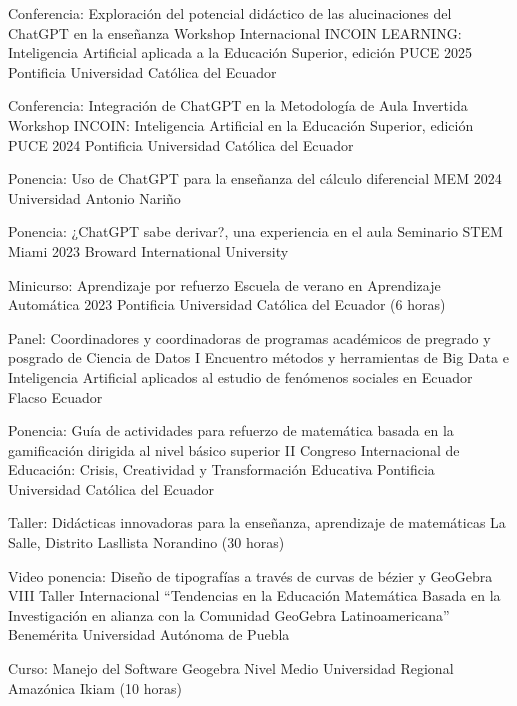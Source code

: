 \documentclass[
    a4paper,
    maincolor=cvblue!70!blue,
    sidecolor=gray!30,
    sectioncolor=cvblue!70!blue,
    sidebarwidth=7.5cm,
    topbottommargin=20pt,
    leftrightmargin=20pt,
]{fortysecondscv}
\begin{document}
    {Conferencia: Exploración del potencial didáctico de las alucinaciones del ChatGPT en la enseñanza}
    {Workshop Internacional INCOIN LEARNING: Inteligencia Artificial aplicada a la Educación Superior, edición PUCE 2025}
    {Pontificia Universidad Católica del Ecuador}
    
    {Conferencia: Integración de ChatGPT en la Metodología de Aula Invertida}
    {Workshop INCOIN: Inteligencia Artificial en la Educación Superior, edición PUCE 2024}
    {Pontificia Universidad Católica del Ecuador}
    
    {Ponencia: Uso de ChatGPT para la enseñanza del cálculo diferencial}
    {MEM 2024}
    {Universidad Antonio Nariño}
    
    {Ponencia: ¿ChatGPT sabe derivar?, una experiencia en el aula}
    {Seminario STEM Miami 2023}
    {Broward International University}
    
    
    {Minicurso: Aprendizaje por refuerzo}
    {Escuela de verano en Aprendizaje Automática 2023}
    {Pontificia Universidad Católica del Ecuador (6 horas)}
    
    
    {Panel: Coordinadores y coordinadoras de  programas académicos de pregrado y posgrado de Ciencia de Datos}
    {I Encuentro métodos y herramientas de Big Data e Inteligencia Artificial aplicados al estudio de fenómenos sociales en Ecuador}
    {Flacso Ecuador}
    
    {Ponencia: Guía de actividades para refuerzo de matemática basada en la gamificación dirigida al nivel básico superior}
    {II Congreso Internacional de Educación: Crisis, Creatividad y Transformación Educativa}
    {Pontificia Universidad Católica del Ecuador}
    
    {Taller: Didácticas innovadoras para la enseñanza, aprendizaje de matemáticas}
    {}
    {La Salle, Distrito Lasllista Norandino (30 horas)}
    
    {Video ponencia: Diseño de tipografías a través de curvas de bézier y GeoGebra}
    {VIII Taller Internacional “Tendencias en la Educación Matemática Basada en la Investigación en alianza con la Comunidad GeoGebra Latinoamericana”}
    {Benemérita Universidad Autónoma de Puebla}
    

    {Curso: Manejo del Software Geogebra Nivel Medio}
    {}
    {Universidad Regional Amazónica Ikiam (10 horas)}
    
\end{document}
